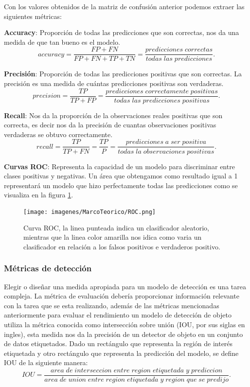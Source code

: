 Con los valores obtenidos de la matriz de confusión anterior podemos extraer las siguientes métricas:

\textbf{Accuracy}: Proporción de todas las predicciones que son correctas, nos da una medida de que tan bueno es el modelo.
\begin{equation}
accuracy = \frac{FP+FN}{FP+FN+TP+TN}=\frac{predicciones\;correctas}{todas\;las\;predicciones}.
\end{equation}

\textbf{Precisión}: Proporción de todas las predicciones positivas que son correctas. La precisión es una medida de cuántas predicciones positivas son verdaderas.
\begin{equation}
precision=\frac{TP}{TP+FP}= \frac{predicciones\;correctamente\;positivas}{todas\;las\;predicciones\;positivas}.
\end{equation}

\textbf{Recall}: Nos da la proporción de la observaciones reales positivas que son correcta, es decir nos da la precisión de cuantas observaciones positivas verdaderas se obtuvo correctamente.
\begin{equation}
recall = \frac{TP}{TP+FN} = \frac{TP}{P} = \frac{predicciones\;a\;ser\;positiva}{todas\;la\;observaciones\;positivas} .
\end{equation}

\textbf{Curvas ROC}: Representa la capacidad de un modelo para discriminar entre clases positivas y negativas. Un área que obtengamos  como resultado igual a 1 representará un modelo que hizo perfectamente todas las predicciones como se visualiza en la figura \ref{Fig: roc}.
\begin{figure}[H]
 \centering
  \texttt{[image: imagenes/MarcoTeorico/ROC.png]}
  \caption{Curva ROC, la linea punteada indica un clasificador aleatorio, mientras que la linea color amarilla nos idica como varia un clasificador en relación a los falsos positivos e verdaderos positivo.} \label{Fig: roc}
\end{figure}

\subsubsection*{Métricas de detección}\label{sub:metricas_de_deteccion}
Elegir o diseñar una medida apropiada para un modelo de detección es una tarea compleja. La métrica de evaluación debería proporcionar información relevante con la tarea que se esta realizando, además de las métricas mencionadas anteriormente para evaluar el rendimiento un modelo de detección de objeto utiliza la métrica conocida como intersección sobre unión (IOU, por sus siglas en ingles), esta medida nos da la precisión de un detector de objeto en un conjunto de datos etiquetados. Dado un rectángulo que representa la región de interés etiquetada y otro rectángulo que representa la predicción del modelo, se define IOU de la siguiente manera:
\begin{equation}
IOU = \frac{area\;de\;interseccion\;entre\;region\;etiquetada\;y\;prediccion}{area\;de\;union\;entre\;region\;etiquetada\;y\;region\;que\;se\;predijo}.
\end{equation}

